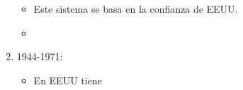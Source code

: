 \begin{enumerate}
\begin{itemize}
            \item Este sistema se basa en la confianza de EEUU.
            \item 
        \end{itemize}
    
    \item 1944-1971: 
        \begin{itemize}
            \item En EEUU tiene 
        \end{itemize}
\end{enumerate}
    
